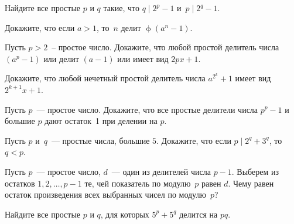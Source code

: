 


\begingroup
    \ifdefined\mupphi
        \def\eulerphi{\mathup{\mupphi}}%
    \fi \ifdefined\upphi
        \def\eulerphi{\upphi}%
    \fi
    \providecommand\eulerphi{\phi}%

\begin{problems}

\item
Найдите все простые $p$ и $q$ такие, что $q \mid 2^{p} - 1$
и~$p \mid 2^{q} - 1$.

\item
Докажите, что если $a > 1$, то~$n$ делит $\eulerphi(a^{n} - 1)$.

\item
Пусть $p > 2$~-- простое число.
Докажите, что любой простой делитель числа $(a^{p} - 1)$ или делит $(a - 1)$
или имеет вид $2 p x + 1$.

\item
Докажите, что любой нечетный простой делитель числа $a^{2^{k}} + 1$ имеет вид
$2^{k+1} x + 1$.

\item
Пусть $p$~--- простое число.
Докажите, что все простые делители числа $p^{p} - 1$ и большие $p$ дают
остаток~1 при делении на $p$.

\item
Пусть $p$ и~$q$~--- простые числа, большие $5$.
Докажите, что если $p \mid 2^{q} + 3^{q}$, то~$q < p$.

\item
Пусть $p$~--- простое число, $d$~--- один из делителей числа $p - 1$.
Выберем из остатков $1, 2, \ldots, p - 1$ те, чей показатель по модулю~$p$
равен $d$.
Чему равен остаток произведения всех выбранных чисел по модулю~$p$?

\item
Найдите все простые $p$ и $q$, для которых $5^{p} + 5^{q}$ делится на $p q$.

\end{problems}

\endgroup %

